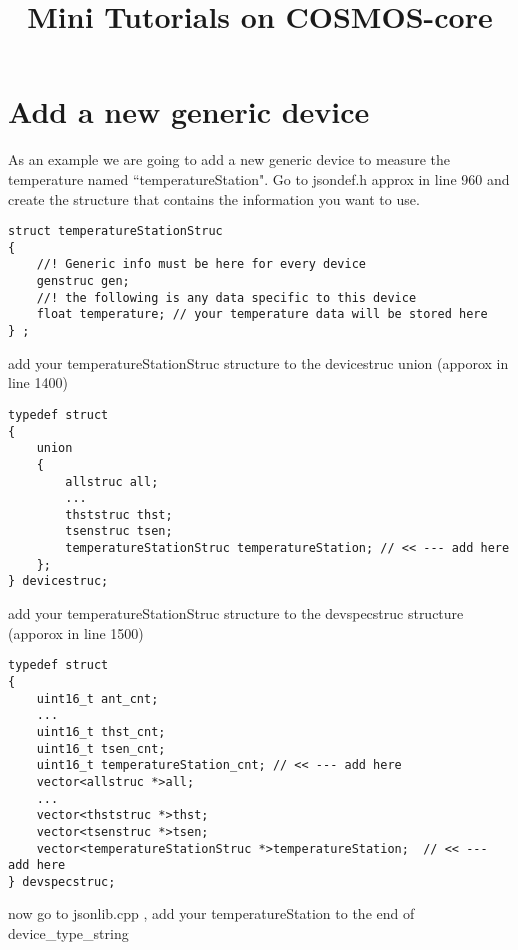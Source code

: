 \documentclass[10pt,letterpaper]{article}
\title{Mini Tutorials on COSMOS-core}
\begin{document}
\maketitle
\tableofcontents



\newpage
\section{Add a new generic device}

As an example we are going to add a new generic device to measure the temperature named ``temperatureStation". Go to jsondef.h approx in line 960 and create the structure that  contains the information you want to use.

\begin{lstlisting}
struct temperatureStationStruc
{
	//! Generic info must be here for every device
	genstruc gen;
	//! the following is any data specific to this device
	float temperature; // your temperature data will be stored here
} ;

\end{lstlisting}

add your temperatureStationStruc structure to the devicestruc union (apporox in line 1400)

\begin{lstlisting}
typedef struct
{
	union
	{
		allstruc all;
		...
		thststruc thst;
		tsenstruc tsen;
		temperatureStationStruc temperatureStation; // << --- add here
	};
} devicestruc;

\end{lstlisting}


add your temperatureStationStruc structure to the devspecstruc structure (apporox in line 1500)


\begin{lstlisting}
typedef struct
{
	uint16_t ant_cnt;
	...
	uint16_t thst_cnt;
	uint16_t tsen_cnt; 
	uint16_t temperatureStation_cnt; // << --- add here
	vector<allstruc *>all;
	...
	vector<thststruc *>thst;
	vector<tsenstruc *>tsen;
	vector<temperatureStationStruc *>temperatureStation;  // << --- add here
} devspecstruc;

\end{lstlisting}


now go to jsonlib.cpp , add your temperatureStation to the end of device\_type\_string
\end{document}
